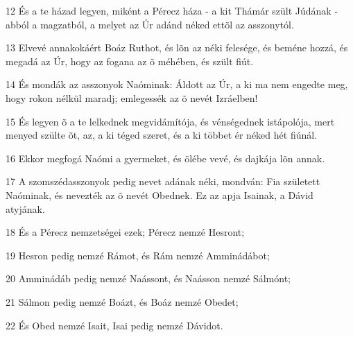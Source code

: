 \par 12 És a te házad legyen, miként a Pérecz háza - a kit Thámár szült Júdának - abból a magzatból, a melyet az Úr adánd néked ettõl az asszonytól.
\par 13 Elvevé annakokáért Boáz Ruthot, és lõn az néki felesége, és beméne hozzá, és megadá az Úr, hogy az fogana az õ méhében, és szült fiút.
\par 14 És mondák az asszonyok Naóminak: Áldott az Úr, a ki ma nem engedte meg, hogy rokon nélkül maradj; emlegessék az õ nevét Izráelben!
\par 15 És legyen õ a te lelkednek megvidámítója, és vénségednek istápolója, mert menyed szülte õt, az, a ki téged szeret, és a ki többet ér néked hét fiúnál.
\par 16 Ekkor megfogá Naómi a gyermeket, és ölébe vevé, és dajkája lõn annak.
\par 17 A szomszédasszonyok pedig nevet adának néki, mondván: Fia született Naóminak, és nevezték az õ nevét Obednek. Ez az apja Isainak, a Dávid atyjának.
\par 18 És a Pérecz nemzetségei ezek; Pérecz nemzé Hesront;
\par 19 Hesron pedig nemzé Rámot, és Rám nemzé Amminádábot;
\par 20 Amminádáb pedig nemzé Naássont, és Naásson nemzé Sálmónt;
\par 21 Sálmon pedig nemzé Boázt, és Boáz nemzé Obedet;
\par 22 És Obed nemzé Isait, Isai pedig nemzé Dávidot.


